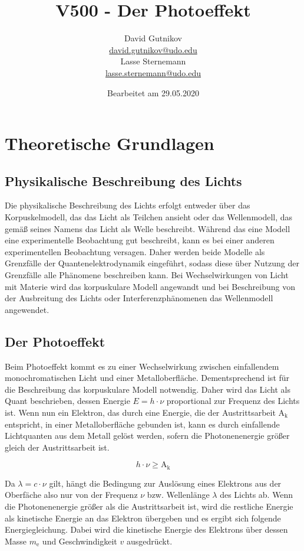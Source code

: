 \documentclass[titlepage = firstcover]{scrartcl}
\title{V500 - Der Photoeffekt}
\author{
  David Gutnikov\\
  \href{mailto:david.gutnikov@udo.edu}{david.gutnikov@udo.edu}\\
  Lasse Sternemann\\
  \href{mailto:lasse.sternemann@udo.edu}{lasse.sternemann@udo.edu}
}
\date{Bearbeitet am 29.05.2020}
\begin{document}
    \maketitle
    \newpage
    \tableofcontents
    \newpage


    \section{Theoretische Grundlagen}
        \subsection{Physikalische Beschreibung des Lichts}
        Die physikalische Beschreibung des Lichts erfolgt entweder über das Korpuskelmodell, das das Licht als Teilchen ansieht oder das Wellenmodell, das gemäß seines Namens das Licht als Welle 
        beschreibt. Während das eine Modell eine experimentelle Beobachtung gut beschreibt, kann es bei einer anderen experimentellen Beobachtung versagen. Daher werden beide Modelle als Grenzfälle
        der Quantenelektrodynamik eingeführt, sodass diese über Nutzung der Grenzfälle alle Phänomene beschreiben kann. Bei Wechselwirkungen von Licht mit Materie wird das korpuskulare Modell 
        angewandt und bei Beschreibung von der Ausbreitung des Lichts oder Interferenzphänomenen das Wellenmodell angewendet.
        
        \subsection{Der Photoeffekt}
        Beim Photoeffekt kommt es zu einer Wechselwirkung zwischen einfallendem monochromatischen Licht und einer Metalloberfläche. Dementsprechend ist für die Beschreibung das korpuskulare Modell 
        notwendig. Daher wird das Licht als Quant beschrieben, dessen Energie $E=h \cdot \nu$ proportional zur Frequenz des Lichts ist. Wenn nun ein Elektron, das durch eine Energie, die der 
        Austrittsarbeit $\text{A}_{\text{k}}$ entspricht, in einer Metalloberfläche gebunden ist, kann es durch einfallende Lichtquanten aus dem Metall gelöst werden, sofern die Photonenenergie größer 
        gleich der Austrittsarbeit ist.

        \begin{equation*}
            h \cdot \nu \geqslant \text{A}_{\text{k}}
        \end{equation*}

        \noindent
        Da $\lambda = c \cdot \nu$ gilt, hängt die Bedingung zur Auslösung eines Elektrons aus der Oberfäche also nur von der Frequenz $\nu$ bzw. Wellenlänge $\lambda$ des Lichts ab. Wenn die 
        Photonenenergie größer als die Austrittsarbeit ist, wird die restliche Energie als kinetische Energie an das Elektron übergeben und es ergibt sich folgende Energiegleichung. 
        Dabei wird die kinetische Energie des Elektrons über dessen Masse $m_{\text{e}}$ und Geschwindigkeit $v$ ausgedrückt.
        
\end{document}
